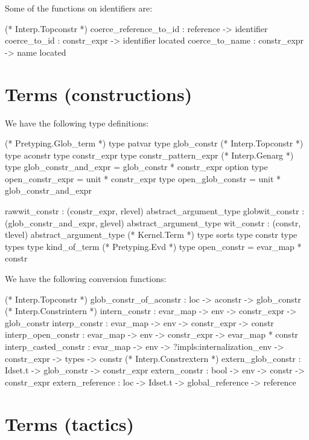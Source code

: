 \documentclass[a4paper,oneside]{book}
\begin{document}
Some of the functions on identifiers are:

\begin{code}
(* Interp.Topconstr *)
coerce_reference_to_id : reference -> identifier
coerce_to_id : constr_expr -> identifier located
coerce_to_name : constr_expr -> name located
\end{code}

\section{Terms (constructions)}

We have the following type definitions:

\begin{code}
(* Pretyping.Glob_term *)
type patvar
type glob_constr
(* Interp.Topconstr *)
type aconstr
type constr_expr
type constr_pattern_expr
(* Interp.Genarg *)
type glob_constr_and_expr = glob_constr * constr_expr option
type open_constr_expr = unit * constr_expr
type open_glob_constr = unit * glob_constr_and_expr

rawwit_constr  : (constr_expr,          rlevel) abstract_argument_type
globwit_constr : (glob_constr_and_expr, glevel) abstract_argument_type
wit_constr     : (constr,               tlevel) abstract_argument_type
(* Kernel.Term *)
type sorts
type constr
type types
type kind_of_term
(* Pretyping.Evd *)
type open_constr = evar_map * constr
\end{code}

We have the following conversion functions:

\begin{code}
(* Interp.Topconstr *)
glob_constr_of_aconstr : loc -> aconstr -> glob_constr
(* Interp.Constrintern *)
intern_constr : evar_map -> env -> constr_expr -> glob_constr
interp_constr : evar_map -> env -> constr_expr -> constr
interp_open_constr : evar_map -> env -> constr_expr -> evar_map * constr
interp_casted_constr : evar_map -> env -> ?impls:internalization_env -> 
                       constr_expr -> types -> constr
(* Interp.Constrextern *)
extern_glob_constr : Idset.t -> glob_constr -> constr_expr
extern_constr : bool -> env -> constr -> constr_expr
extern_reference : loc -> Idset.t -> global_reference -> reference
\end{code}

\section{Terms (tactics)}
\end{document}
